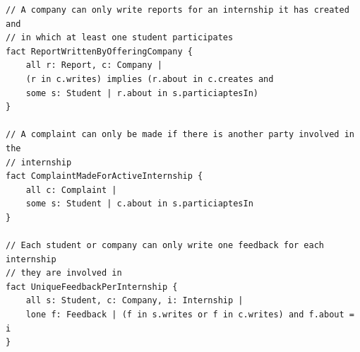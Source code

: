 \documentclass[11pt,twoside]{article}
\begin{document}
{\begin{verbatim}
// A company can only write reports for an internship it has created and
// in which at least one student participates
fact ReportWrittenByOfferingCompany {
    all r: Report, c: Company |
    (r in c.writes) implies (r.about in c.creates and 
    some s: Student | r.about in s.particiaptesIn)
}

// A complaint can only be made if there is another party involved in the
// internship
fact ComplaintMadeForActiveInternship {
    all c: Complaint |
    some s: Student | c.about in s.particiaptesIn
}

// Each student or company can only write one feedback for each internship
// they are involved in
fact UniqueFeedbackPerInternship {
    all s: Student, c: Company, i: Internship |
    lone f: Feedback | (f in s.writes or f in c.writes) and f.about = i
}
\end{verbatim}}
\end{document}
